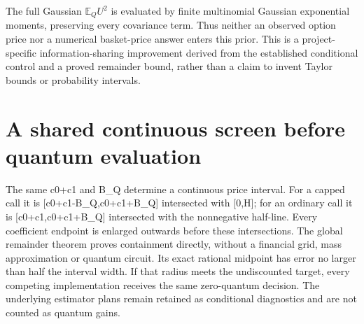 The full Gaussian $\mathbb E_Q U^2$ is evaluated by finite multinomial
Gaussian exponential moments, preserving every covariance term. Thus neither
an observed option price nor a numerical basket-price answer enters this
prior. This is a project-specific information-sharing improvement derived
from the established conditional control and a proved remainder bound,
rather than a claim to invent Taylor bounds or probability intervals.

\section{A shared continuous screen before quantum evaluation}
The same c0+c1 and B_Q determine a continuous price interval. For a capped
call it is [c0+c1-B_Q,c0+c1+B_Q] intersected with [0,H]; for an ordinary
call it is [c0+c1,c0+c1+B_Q] intersected with the nonnegative half-line.
Every coefficient endpoint is enlarged outwards before these intersections.
The global remainder theorem proves containment directly, without a
financial grid, mass approximation or quantum circuit. Its exact rational
midpoint has error no larger than half the interval width. If that radius
meets the undiscounted target, every competing implementation receives the
same zero-quantum decision. The underlying estimator plans remain retained
as conditional diagnostics and are not counted as quantum gains.
